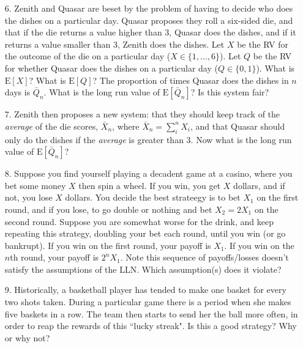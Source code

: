 \documentclass[10pt]{extarticle}
\newcommand{\E}{\text{E}}
\begin{document}
\begin{itemize}

	\item[6.] Zenith and Quasar are beset by the problem of having to decide who does the dishes on a particular day. Quasar proposes they roll a six-sided die, and that if the die returns a value higher than 3, Quasar does the dishes, and if it returns a value smaller than 3, Zenith does the dishes. Let $X$ be the RV for the outcome of the die on a particular day ($X \in \{1,...,6\}$). Let $Q$ be the RV for whether Quasar does the dishes on a particular day ($Q \in \{0,1 \}$). What is $\E[X]$? What is $\E[Q]$? The proportion of times Quasar does the dishes in $n$ days is $\bar Q_n$. What is the long run value of $\E[\bar Q_n]$? Is this system fair? \\ 

	\item[7.] Zenith then proposes a new system: that they should keep track of the {\it average} of the die scores, $\bar X_n$, where $\bar X_n = \sum_i^n  X_i$, and that Quasar should only do the dishes if the {\it average} is greater than 3. Now what is the long run value of $\E[\bar Q_n]$? \\ 

	\item[8.] Suppose you find yourself playing a decadent game at a casino, where you bet some money $X$ then spin a wheel. If you win, you get $X$ dollars, and if not, you lose $X$ dollars. You decide the best strateegy is to bet $X_1$ on the first round, and if you lose, to go double or nothing and bet $X_2 = 2X_1$ on the second round. Suppose you are somewhat worse for the drink, and keep repeating this strategy, doubling your bet each round, until you win (or go bankrupt). If you win on the first round, your payoff is $X_1$. If you win on the $n$th  round, your payoff is $2^n X_1$. Note this sequence of payoffs/losses doesn't satisfy the assumptions of the LLN. Which assumption(s) does it violate? \\ 

	\item[9.] Historically, a basketball player has tended to make one basket for every two shots taken. During a particular game there is a period when she makes five baskets in a row. The team then starts to send her the ball more often, in order to reap the rewards of this ``lucky streak". Is this a good strategy? Why or why not?  

\end{itemize}
\end{document}
